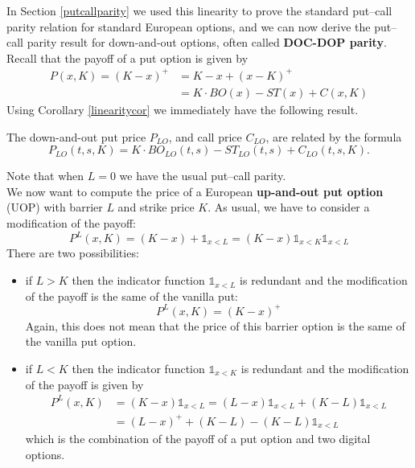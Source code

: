 In Section \ref{putcallparity} we used this linearity to prove the standard put–call parity relation for standard European options, and we can now derive the put–call parity result for down-and-out options, often called \textbf{DOC-DOP parity}. Recall that the payoff of a put option is given by
\begin{align*}
    P(x,K) = (K-x)^+ &= K - x + (x - K)^+ \\
    &=
    K\cdot BO(x) - ST(x) + C(x,K)
\end{align*}
Using Corollary \ref{linearitycor} we immediately have the following result.
\begin{proposition}
    The down-and-out put price $P_{LO}$, and call price $C_{LO}$, are related by the formula
    \begin{equation}
        P_{LO}(t, s, K) = K\cdot BO_{LO}(t, s) - ST_{LO}(t,s) + C_{LO}(t, s, K).
    \end{equation}
\end{proposition}
Note that when $L = 0$ we have the usual put–call parity.\\
We now want to compute the price of a European \textbf{up-and-out put option} (UOP) with barrier $L$ and strike price $K$. As usual, we have to consider a modification of the payoff:
\begin{equation}
    P^L(x,K)=(K-x)+\mathds{1}_{x<L} = (K-x)\mathds{1}_{x<K}\mathds{1}_{x<L}
\end{equation}
There are two possibilities:
\begin{itemize}
    \item if $L > K$ then the indicator function $\mathds{1}_{x<L}$ is redundant and the modification of the payoff is the same of the vanilla put:
    \begin{equation*}
        P^L(x, K) = (K - x)^+
    \end{equation*}
    Again, this does not mean that the price of this barrier option is the same of the vanilla put option.
    \item if $L < K$ then the indicator function $\mathds{1}_{x<K}$ is redundant and the modification of the payoff is given by
    \begin{align*}
        P^L(x, K) &= (K-x)\mathds{1}_{x<L} =(L-x)\mathds{1}_{x<L}+(K-L)\mathds{1}_{x<L} \\
        &=
        (L-x)^+ +(K-L)-(K-L)\mathds{1}_{x<L}
    \end{align*}
    which is the combination of the payoff of a put option and two digital options.
\end{itemize}
